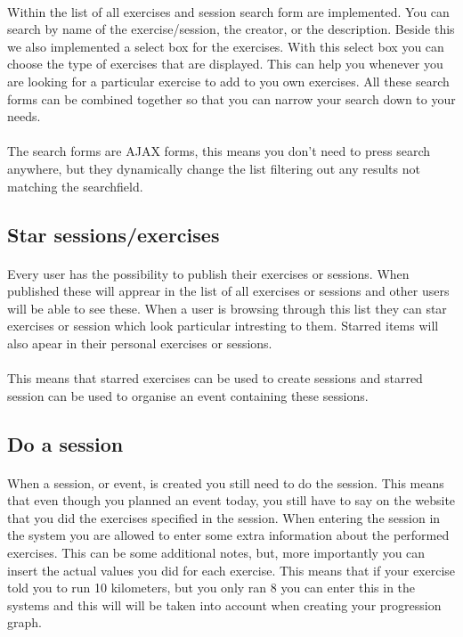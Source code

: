 \documentclass[11pt,a4paper]{scrartcl}
\begin{document}
\paragraph{}Within the list of all exercises and session search form are implemented. You can search by name of the exercise/session, the creator, or the description. Beside this we also implemented a select box for the exercises. With this select box you can choose the type of exercises that are displayed. This can help you whenever you are looking for a particular exercise to add to you own exercises. All these search forms can be combined together so that you can narrow your search down to your needs.
\paragraph{}The search forms are AJAX forms, this means you don't need to press search anywhere, but they dynamically change the list filtering out any results not matching the searchfield.

\subsection{Star sessions/exercises}
\paragraph{}Every user has the possibility to publish their exercises or sessions. When published these will apprear in the list of all exercises or sessions and other users will be able to see these. When a user is browsing through this list they can star exercises or session which look particular intresting to them. Starred items will also apear in their personal exercises or sessions.
\paragraph{}This means that starred exercises can be used to create sessions and starred session can be used to organise an event containing these sessions.

\subsection{Do a session}
\paragraph{}When a session, or event, is created you still need to do the session. This means that even though you planned an event today, you still have to say on the website that you did the exercises specified in the session. When entering the session in the system you are allowed to enter some extra information about the performed exercises. This can be some additional notes, but, more importantly you can insert the actual values you did for each exercise. This means that if your exercise told you to run 10 kilometers, but you only ran 8 you can enter this in the systems and this will will be taken into account when creating your progression graph.
\end{document}
